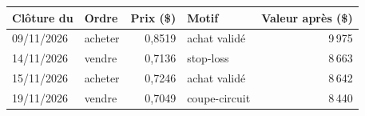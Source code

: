 \begin{tabular}{llrlr}\toprule
Clôture du & Ordre & Prix (\$) & Motif & Valeur après (\$) \\\midrule
09/11/2026 & acheter & 0,8519 & achat validé & 9\,975 \\
14/11/2026 & vendre & 0,7136 & stop-loss & 8\,663 \\
15/11/2026 & acheter & 0,7246 & achat validé & 8\,642 \\
19/11/2026 & vendre & 0,7049 & coupe-circuit & 8\,440 \\
\bottomrule\end{tabular}
